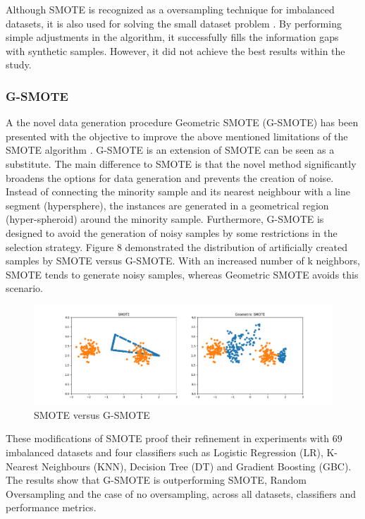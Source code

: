 \documentclass[parskip=full]{scrartcl}
\begin{document}
Although SMOTE is recognized as a oversampling technique for imbalanced
datasets, it is also used for solving the small dataset problem \cite{Li.2018}.
By performing simple adjustments in the algorithm, it successfully fills the
information gaps with synthetic samples. However, it did not achieve the best
results within the study.

\subsubsection{G-SMOTE}

A the novel data generation procedure Geometric SMOTE (G-SMOTE) has been 
presented with the objective to improve the above mentioned limitations of the 
SMOTE algorithm \cite{Douzas.2019b}. G-SMOTE is an extension of SMOTE can be 
seen as a substitute. The main difference to SMOTE is that the novel method 
significantly broadens the options for data generation and prevents the 
creation of noise. Instead of connecting the minority sample and its nearest 
neighbour with a line segment (hypersphere), the instances are generated in a 
geometrical region (hyper-spheroid) around the minority sample. Furthermore, 
G-SMOTE is designed to avoid the generation of noisy samples by some 
restrictions in the selection strategy. Figure 8 demonstrated the distribution 
of artificially created samples by SMOTE versus G-SMOTE. With an increased 
number of k neighbors, SMOTE tends to generate noisy samples, whereas Geometric 
SMOTE avoids this scenario.

\begin{figure}[H]
	\centering
	\includegraphics[width=0.8\linewidth]{resources/smote_vs_gsmote}
	\caption{SMOTE versus G-SMOTE \cite{Douzas.2019}}
	\label{fig:smotevsgsmote}
\end{figure}

These modifications of SMOTE proof their refinement in experiments with 69 
imbalanced datasets and four classifiers such as Logistic Regression (LR), 
K-Nearest Neighbours (KNN), Decision Tree (DT) and Gradient Boosting (GBC). The 
results show that G-SMOTE is outperforming SMOTE, Random Oversampling and the 
case of no oversampling, across all datasets, classifiers and performance 
metrics.    
\end{document}
